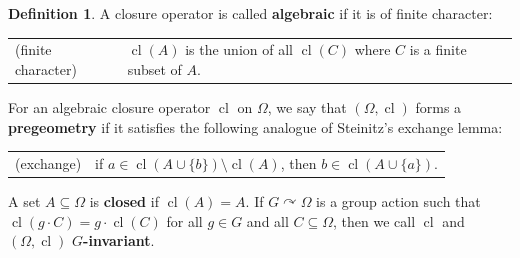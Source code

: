\documentclass{article}
\theoremstyle{remark}
\theoremstyle{definition}
\newtheorem{definition}[theorem]{Definition}
\def\acts{\curvearrowright}
\DeclareMathOperator{\cl}{cl}
\begin{document}
{{\begin{definition}
{A} closure operator is {called} \textbf{algebraic} if it %
is of finite character:

\begin{tabular}{ll}
{\sc(finite character)} &  $\cl(A)$ is the union of all $\cl(C)$ where $C$ is a finite subset of $A$.
\end{tabular}

{For an algebraic closure operator $\cl$ on $\Omega$, we say that $(\Omega,\cl)$}   %
forms a \textbf{pregeometry} if it satisfies the following %
analogue of Steinitz's exchange  lemma: %

\begin{tabular}{ll}
  {\sc (exchange)} &  if $a\in\cl(A\cup\{b\})\setminus\cl(A)$, then $b\in\cl(A\cup\{a\})$.  
\end{tabular}

     {A set} $A\subseteq \Omega$ is  \textbf{closed} if $\cl(A)=A$. {If $G\acts\Omega$ is a group action such that $\cl(g\cdot C)=g\cdot \cl(C)$ for all $g\in G$ and all $C\subseteq \Omega$, then we call $\cl$ and  $(\Omega,\cl)$ \textbf{$G$-invariant}.}
\end{definition}

}}
\end{document}
